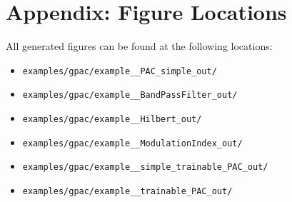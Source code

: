 \documentclass[11pt,a4paper]{article}
\begin{document}
\begin{center}
\end{center}

\section{Appendix: Figure Locations}

All generated figures can be found at the following locations:

\begin{itemize}
\item \texttt{examples/gpac/example\_\_PAC\_simple\_out/}
\item \texttt{examples/gpac/example\_\_BandPassFilter\_out/}
\item \texttt{examples/gpac/example\_\_Hilbert\_out/}
\item \texttt{examples/gpac/example\_\_ModulationIndex\_out/}
\item \texttt{examples/gpac/example\_\_simple\_trainable\_PAC\_out/}
\item \texttt{examples/gpac/example\_\_trainable\_PAC\_out/}
\end{itemize}
\end{document}
